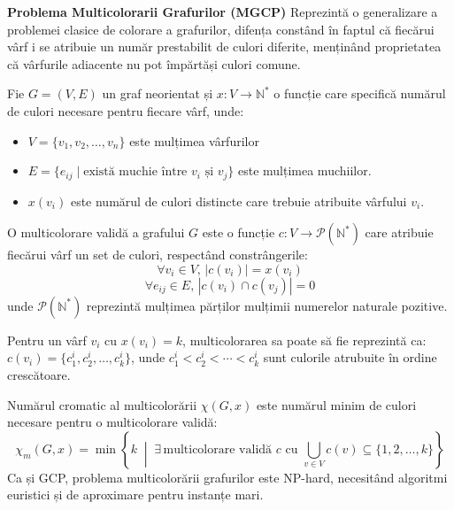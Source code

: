 {\bf Problema Multicolorarii Grafurilor (MGCP)}
 Reprezintă o generalizare a problemei clasice de colorare a grafurilor, difența constând în faptul că fiecărui vârf i se atribuie un număr prestabilit de culori diferite, menținând proprietatea că vârfurile adiacente nu pot împărtăși culori comune.
\begin{Def}
  Fie $G=(V,E)$ un graf neorientat și $x: V \rightarrow \mathbb{N}^*$ o funcție care specifică numărul de culori necesare pentru fiecare vârf, unde:
  \begin{itemize}
    \item $V = \{v_1, v_2, \ldots, v_n\}$ este mulțimea vârfurilor
    \item $E = \{e_{ij} \mid \text{există muchie între } v_i \text{ și } v_j\}$ este mulțimea muchiilor.
    \item $x(v_i)$ este numărul de culori distincte care trebuie atribuite vârfului $v_i$.
    
  \end{itemize}
  O multicolorare validă a grafului $G$ este o funcție $c:V \rightarrow  \mathcal{P}(\mathbb{N}^*)$ care atribuie fiecărui vârf un set de culori, respectând
  constrângerile:
  \begin{equation}
    \forall v_i \in V,\, | c(v_i)|= x(v_i)
     \end{equation}
     \begin{equation}
     \forall e_{ij} \in E,\, |c(v_i) \cap c(v_j)| = 0
  \end{equation}
  unde $\mathcal{P}(\mathbb{N}^*)$ reprezintă mulțimea părților mulțimii numerelor naturale pozitive.

  Pentru un vârf $v_i$ cu $x(v_i)=k$, multicolorarea sa poate să fie reprezintă ca: $c(v_i)=\{c_1^i,c_2^i, \ldots, c_k^i\}$, unde $c_1^i < c_2^i < \cdots < c_k^i$ sunt culorile atrubuite în ordine crescătoare.

  Numărul cromatic al multicolorării $\chi(G,x)$ este numărul minim de culori necesare pentru o multicolorare validă:
\begin{equation}
\chi_m(G,x) = \min\left\{k \;\middle|\; \exists\, \text{multicolorare validă } c \text{ cu } \bigcup_{v \in V} c(v) \subseteq \{1, 2, \ldots, k\} \right\}
\end{equation}
Ca și GCP, problema multicolorării grafurilor este NP-hard, necesitând algoritmi euristici și de aproximare pentru instanțe mari.
\end{Def}

